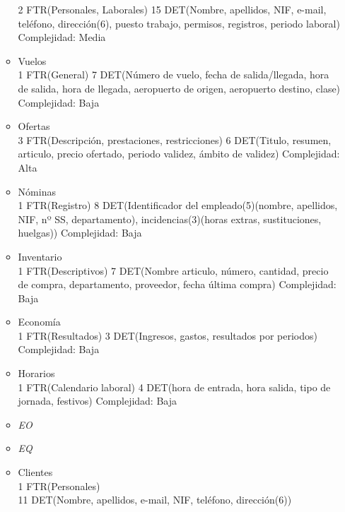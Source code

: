 \begin{enumerate}
\begin{itemize}
					2 FTR(Personales, Laborales)
					15 DET(Nombre, apellidos, NIF, e-mail, teléfono, dirección(6), puesto trabajo, permisos, registros, periodo laboral)
					Complejidad: Media\\
				\item Vuelos\\
					1 FTR(General)
					7 DET(Número de vuelo, fecha de salida/llegada, hora de salida, hora de llegada, aeropuerto de origen, aeropuerto destino,
					clase)
					Complejidad: Baja\\
				\item Ofertas\\
					3 FTR(Descripción, prestaciones, restricciones)
					6 DET(Titulo, resumen, articulo, precio ofertado, periodo validez, ámbito de validez)
					Complejidad: Alta\\
				\item Nóminas\\
					1 FTR(Registro)
					8 DET(Identificador del empleado(5)(nombre, apellidos, NIF, nº SS, departamento), incidencias(3)(horas extras,
					sustituciones, huelgas))
					Complejidad: Baja\\
				\item Inventario\\
					1 FTR(Descriptivos)
					7 DET(Nombre articulo, número, cantidad, precio de compra, departamento, proveedor, fecha última compra)
					Complejidad: Baja\\
				\item Economía\\
					1 FTR(Resultados)
					3 DET(Ingresos, gastos, resultados por periodos)
					Complejidad: Baja\\
				\item Horarios\\
					1 FTR(Calendario laboral)
					4 DET(hora de entrada, hora salida, tipo de jornada, festivos)
					Complejidad: Baja\\
			\end{itemize}
			\begin{itemize}
			\item \textsl{EO}
			\end{itemize}
			\begin{itemize}
			\item \textsl{EQ}
				\item Clientes \\
					1 FTR(Personales) \\
					11 DET(Nombre, apellidos, e-mail, NIF, teléfono, dirección(6)) \\

\end{itemize}
\end{enumerate}
